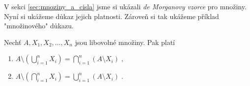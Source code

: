 V sekci \ref{sec:mnoziny_a_cisla} jsme si ukázali \emph{de Morganovy vzorce} pro množiny. Nyní si ukážeme důkaz jejich platnosti. Zároveň si tak ukážeme příklad "množinového" důkazu.
\begin{assertion}
    Nechť $A,X_1,X_2,\ldots,X_n$ jsou libovolné množiny. Pak platí
    \begin{enumerate}[label=(\roman*)]
        \item\label{item:de_morgan_sets_1} $\displaystyle A \setminus \left(\bigcup\limits_{i=1}^{n}{X_i}\right)=\bigcap\limits_{i=1}^{n}{(A \setminus X_i)}\; ,$
        \item\label{item:de_morgan_sets_2} $\displaystyle A \setminus \left(\bigcap\limits_{i=1}^{n}{X_i}\right)=\bigcup\limits_{i=1}^{n}{(A \setminus X_i)}\; .$
    \end{enumerate}
\end{assertion}
